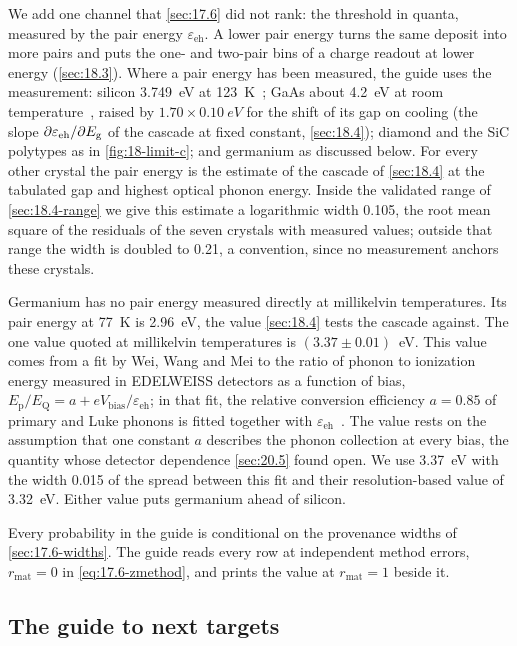 We add one channel that \cref{sec:17.6} did not rank: the threshold in quanta, measured by the pair energy $\varepsilon_{\mathrm{eh}}$. A lower pair energy turns the same deposit into more pairs and puts the one- and two-pair bins of a charge readout at lower energy (\cref{sec:18.3}). Where a pair energy has been measured, the guide uses the measurement: silicon \SI{3.749}{eV} at \SI{123}{K}~\cite{rodrigues2021absolute}; GaAs about \SI{4.2}{eV} at room temperature~\cite[Fig.~1]{nielsen2026first}, raised by $1.70 \times \SI{0.10}{eV}$ for the shift of its gap on cooling (the slope $\partial\varepsilon_{\mathrm{eh}}/\partial E_{\mathrm{g}}$ of the cascade at fixed constant, \cref{sec:18.4}); diamond and the SiC polytypes as in \cref{fig:18-limit-c}; and germanium as discussed below. For every other crystal the pair energy is the estimate of the cascade of \cref{sec:18.4} at the tabulated gap and highest optical phonon energy. Inside the validated range of \cref{sec:18.4-range} we give this estimate a logarithmic width 0.105, the root mean square of the residuals of the seven crystals with measured values; outside that range the width is doubled to 0.21, a convention, since no measurement anchors these crystals.

Germanium has no pair energy measured directly at millikelvin temperatures. Its pair energy at \SI{77}{K} is \SI{2.96}{eV}, the value \cref{sec:18.4} tests the cascade against. The one value quoted at millikelvin temperatures is $(3.37 \pm 0.01)$~eV. This value comes from a fit by Wei, Wang and Mei to the ratio of phonon to ionization energy measured in EDELWEISS detectors as a function of bias, $E_{\mathrm{p}}/E_{\mathrm{Q}} = a + eV_{\mathrm{bias}}/\varepsilon_{\mathrm{eh}}$; in that fit, the relative conversion efficiency $a = 0.85$ of primary and Luke phonons is fitted together with $\varepsilon_{\mathrm{eh}}$~\cite[Sect.~2.1.4]{wei2016average}. The value rests on the assumption that one constant $a$ describes the phonon collection at every bias, the quantity whose detector dependence \cref{sec:20.5} found open. We use 3.37~eV with the width 0.015 of the spread between this fit and their resolution-based value of 3.32~eV. Either value puts germanium ahead of silicon.

Every probability in the guide is conditional on the provenance widths of \cref{sec:17.6-widths}. The guide reads every row at independent method errors, $r_{\mathrm{mat}} = 0$ in \cref{eq:17.6-zmethod}, and prints the value at $r_{\mathrm{mat}} = 1$ beside it.

\subsection{The guide to next targets}\label{sec:21.7-guide}


